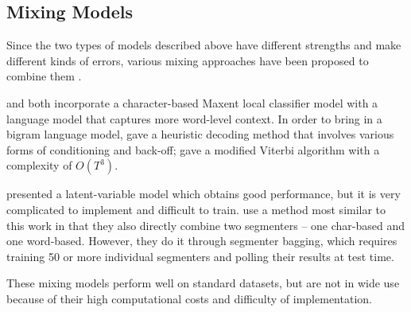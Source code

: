 %
% 

\subsection{Mixing Models} Since the two types of models described above have different strengths and make different kinds of errors, various mixing approaches have been proposed to combine them \cite{Wang:2006:SIGHAN,Lin:2009:CICLing,Sun:2009:HLT-NAACL,Sun:2010:COLING,Wang:2010:COLING}. 


\cite{Lin:2009:CICLing} and \cite{Wang:2006:SIGHAN} both incorporate a character-based Maxent local classifier model with a language model that captures more word-level context.
In order to bring in a bigram language model,  gave a heuristic decoding method that involves various forms of conditioning and back-off;  gave a modified Viterbi algorithm with a complexity of $O(T^3)$. 

\cite{Sun:2009:HLT-NAACL} presented a latent-variable model which obtains good performance, but it is very complicated to implement and difficult to train. 
\cite{Sun:2009:HLT-NAACL} use a method most similar to this work in that they also directly combine two segmenters -- one char-based and one word-based. However, they do it through segmenter bagging, which requires training 50 or more individual segmenters and polling their results at test time. 

These mixing models perform well on standard datasets, but are not in wide use because of their high computational costs and difficulty of implementation.